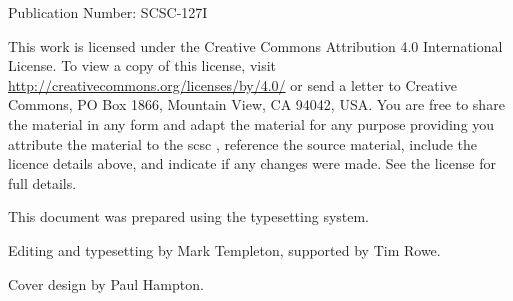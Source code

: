 %
%

%
%

\pagestyle{FirstPageFrontCover}
%
%



 Publication Number: SCSC-127I%

This work is licensed under the Creative Commons Attribution 4.0 International License. To view a copy of this license, visit \href{http://creativecommons.org/licenses/by/4.0/}{http://creativecommons.org/licenses/by/4.0/} or send a letter to Creative Commons, PO Box 1866, Mountain View, CA 94042, USA\@. You are free to share the material in any form and adapt the material for any purpose providing you attribute the material to the \gls{scsc} , reference the source material, include the licence details above, and indicate if any changes were made.  See the license for full details.

This document was prepared using the \LaTeXe\/ typesetting system.

Editing and typesetting by Mark Templeton, \cbstart supported by Tim Rowe\cbend.

Cover design by Paul Hampton.



\clearpage
\pagestyle{ContinuationInsideFrontCover}

